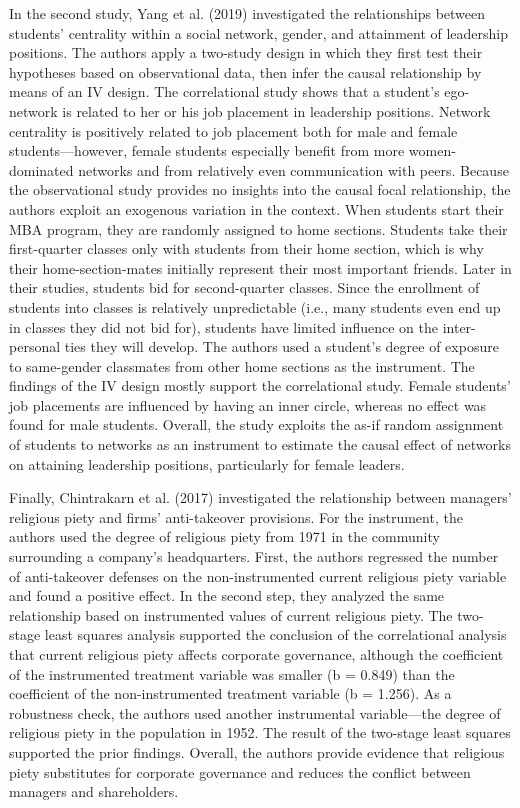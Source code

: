 \documentclass[english]{article}
\begin{document}
In the second study, Yang et al. (2019) investigated the relationships
between students' centrality within a social network, gender, and
attainment of leadership positions. The authors apply a two-study design
in which they first test their hypotheses based on observational data,
then infer the causal relationship by means of an IV design. The
correlational study shows that a student's ego-network is related to her
or his job placement in leadership positions. Network centrality is
positively related to job placement both for male and female
students---however, female students especially benefit from more
women-dominated networks and from relatively even communication with
peers. Because the observational study provides no insights into the
causal focal relationship, the authors exploit an exogenous variation in
the context. When students start their MBA program, they are randomly
assigned to home sections. Students take their first-quarter classes
only with students from their home section, which is why their
home-section-mates initially represent their most important friends.
Later in their studies, students bid for second-quarter classes. Since
the enrollment of students into classes is relatively unpredictable
(i.e., many students even end up in classes they did not bid for),
students have limited influence on the inter-personal ties they will
develop. The authors used a student's degree of exposure to same-gender
classmates from other home sections as the instrument. The findings of
the IV design mostly support the correlational study. Female students'
job placements are influenced by having an inner circle, whereas no
effect was found for male students. Overall, the study exploits the
as-if random assignment of students to networks as an instrument to
estimate the causal effect of networks on attaining leadership
positions, particularly for female leaders.

Finally, Chintrakarn et al. (2017) investigated the relationship between
managers' religious piety and firms' anti-takeover provisions. For the
instrument, the authors used the degree of religious piety from 1971 in
the community surrounding a company's headquarters. First, the authors
regressed the number of anti-takeover defenses on the non-instrumented
current religious piety variable and found a positive effect. In the
second step, they analyzed the same relationship based on instrumented
values of current religious piety. The two-stage least squares analysis
supported the conclusion of the correlational analysis that current
religious piety affects corporate governance, although the coefficient
of the instrumented treatment variable was smaller (b = 0.849) than the
coefficient of the non-instrumented treatment variable (b = 1.256). As a
robustness check, the authors used another instrumental variable---the
degree of religious piety in the population in 1952. The result of the
two-stage least squares supported the prior findings. Overall, the
authors provide evidence that religious piety substitutes for corporate
governance and reduces the conflict between managers and shareholders.
\end{document}
